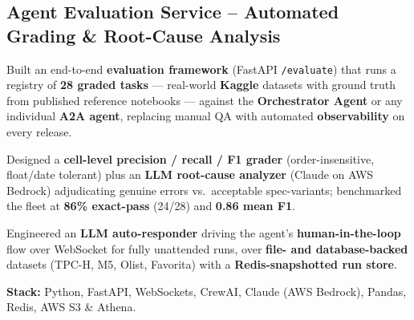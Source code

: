 \documentclass[letter,10pt]{article}
\begin{document}
\subsection{Agent Evaluation Service -- Automated Grading \& Root-Cause Analysis}
\begin{zitemize}
\item Built an end-to-end \textbf{evaluation framework} (FastAPI \texttt{/evaluate}) that runs a registry of \textbf{28 graded tasks} --- real-world \textbf{Kaggle} datasets with ground truth from published reference notebooks --- against the \textbf{Orchestrator Agent} or any individual \textbf{A2A agent}, replacing manual QA with automated \textbf{observability} on every release.
\item Designed a \textbf{cell-level precision / recall / F1 grader} (order-insensitive, float/date tolerant) plus an \textbf{LLM root-cause analyzer} (Claude on AWS Bedrock) adjudicating genuine errors vs.\ acceptable spec-variants; benchmarked the fleet at \textbf{86\% exact-pass} (24/28) and \textbf{0.86 mean F1}.
\item Engineered an \textbf{LLM auto-responder} driving the agent's \textbf{human-in-the-loop} flow over WebSocket for fully unattended runs, over \textbf{file- and database-backed} datasets (TPC-H, M5, Olist, Favorita) with a \textbf{Redis-snapshotted run store}.
\item \textbf{Stack:} Python, FastAPI, WebSockets, CrewAI, Claude (AWS Bedrock), Pandas, Redis, AWS S3 \& Athena.
\end{zitemize}

\end{document}
